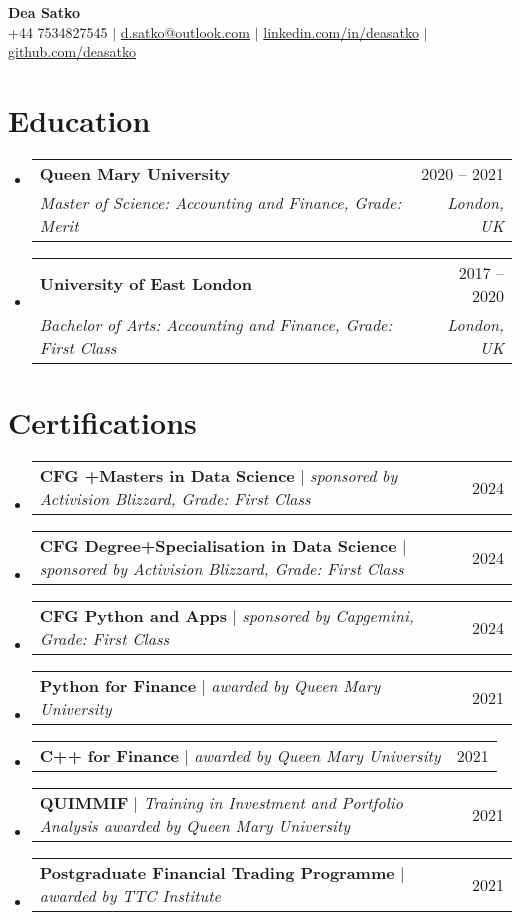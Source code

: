 \documentclass[letterpaper,11pt]{article}
\makeatletter
\newcommand{\resumeSubheading}[4]{
  \vspace{-2pt}\item
    \begin{tabular*}{0.97\textwidth}[t]{l@{\extracolsep{\fill}}r}
      \textbf{#1} & #2 \\
      \textit{\small#3} & \textit{\small #4} \\
    \end{tabular*}\vspace{-7pt}
}
\newcommand{\resumeProjectHeading}[2]{
    \item
    \begin{tabular*}{0.97\textwidth}{l@{\extracolsep{\fill}}r}
      \small#1 & #2 \\
    \end{tabular*}\vspace{-7pt}
}
\newcommand{\resumeSubHeadingListStart}{\begin{itemize}[leftmargin=0.15in, label={}]}
\newcommand{\resumeSubHeadingListEnd}{\end{itemize}}
\makeatother
\begin{document}
\begin{center}
    \textbf{\Huge Dea Satko} \\ \vspace{1pt}
    \small +44 7534827545 $|$ \href{mailto:d.satko@outlook.com}{{d.satko@outlook.com}} $|$ 
    \href{https://www.linkedin.com/in/deasatko/}{{linkedin.com/in/deasatko}} $|$
    \href{https://github.com/deasatko/}{{github.com/deasatko}}
\end{center}


\section{Education}
  \resumeSubHeadingListStart
    \resumeSubheading
      {Queen Mary University}{2020 -- 2021}
      {Master of Science: Accounting and Finance, Grade: Merit}{London, UK}
    \resumeSubheading
      {University of East London}{2017 -- 2020}
      {Bachelor of Arts: Accounting and Finance, Grade: First Class}{London, UK}
  \resumeSubHeadingListEnd

\section{Certifications}
  \resumeSubHeadingListStart
    \resumeProjectHeading
      {\textbf{CFG +Masters in Data Science} $|$ \emph{sponsored by Activision Blizzard, Grade: First Class}}{2024}
    \resumeProjectHeading
      {\textbf{CFG Degree+Specialisation in Data Science} $|$ \emph{sponsored by Activision Blizzard, Grade: First Class}}{2024}
    \resumeProjectHeading
      {\textbf{CFG Python and Apps} $|$ \emph{sponsored by Capgemini, Grade: First Class}}{2024}
    \resumeProjectHeading
      {\textbf{Python for Finance} $|$ \emph{awarded by Queen Mary University}}{2021}
      \resumeProjectHeading
      {\textbf{C++ for Finance} $|$ \emph{awarded by Queen Mary University}}{2021}
    \resumeProjectHeading
      {\textbf{QUIMMIF} $|$ \emph{Training in Investment and Portfolio Analysis awarded by Queen Mary University}}{2021}
    \resumeProjectHeading
      {\textbf{Postgraduate Financial Trading Programme} $|$ \emph{awarded by TTC Institute}}{2021}
\resumeSubHeadingListEnd

\end{document}
